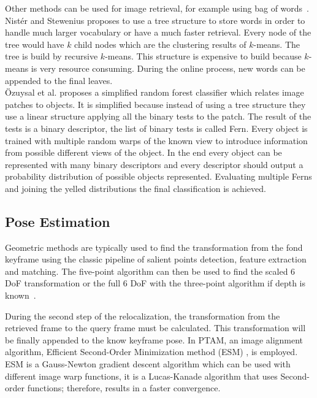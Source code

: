 Other methods can be used for image retrieval, for example using bag of words~\cite{Sivic2003}. Nist\'er and Stewenius \cite{Nister2006} proposes to use a tree structure to store words in order to handle much larger vocabulary or have a much faster retrieval. Every node of the tree would have $k$ child nodes which are the clustering results of $k$-means. The tree is build by recursive $k$-means. This structure is expensive to build because $k$-means is very resource consuming. During the online process, new words can be appended to the final leaves.\\

\"Ozuysal et al. \cite{Ozuysal2010} proposes a simplified random forest classifier which relates image patches to objects. It is simplified because instead of using a tree structure they use a linear structure applying all the binary tests to the patch. The result of the tests is a binary descriptor, the list of binary tests is called Fern. Every object is trained with multiple random warps of the known view to introduce information from possible different views of the object. In the end every object can be represented with many binary descriptors and every descriptor should output a probability distribution of possible objects represented. Evaluating multiple Ferns and joining the yelled distributions the final classification is achieved.\\

\subsection{Pose Estimation}
\label{ssub:pose_estimation}

Geometric methods are typically used to find the transformation from the fond keyframe using the classic pipeline of salient points detection, feature extraction and matching. The five-point algorithm can then be used to find the scaled 6 DoF transformation or the full 6 DoF with the three-point algorithm if depth is known~\cite{hartley2003multiple}.

During the second step of the relocalization, the transformation from the retrieved frame to the query frame must be calculated. This transformation will be finally appended to the know keyframe pose. In PTAM, an image alignment algorithm, Efficient Second-Order Minimization method (ESM) \cite{Benhimane2006}, is employed. ESM is a Gauss-Newton gradient descent algorithm which can be used with different image warp functions, it is a Lucas-Kanade \cite{Baker2004} algorithm that uses Second-order functions; therefore, results in a faster convergence.\\


